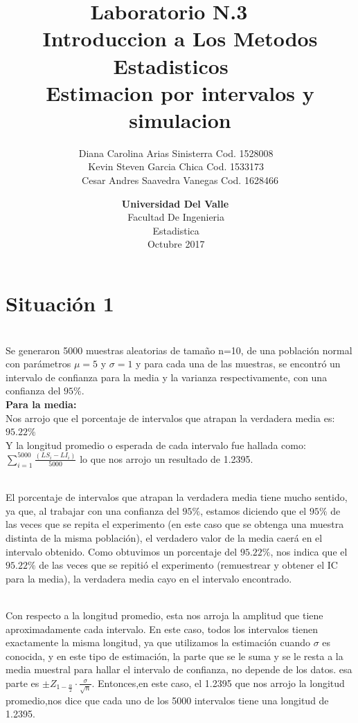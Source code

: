 \documentclass[letterpaper,12pt,onecolumn,titlepage]{article}
\title{
    \textbf{Laboratorio N.3}\
    ~\\{Introduccion a Los Metodos Estadisticos}   
    ~\\{Estimacion por intervalos y simulacion}}
\author{
    {Diana Carolina Arias Sinisterra Cod. 1528008}
 ~\\{Kevin Steven Garcia Chica Cod. 1533173}
 ~\\{Cesar Andres Saavedra Vanegas Cod. 1628466}}
\date{
     \textbf{Universidad Del Valle}\   
    ~\\{Facultad De Ingenieria}
    ~\\{Estadistica}
    ~\\{Octubre 2017}
    ~\\{}}
\begin{document}
 
\renewcommand{\listtablename}{}
\renewcommand{\tablename}{Tabla}
\maketitle
\setcounter{page}{2}
\tableofcontents{}

\thispagestyle{empty}

\newpage
\fancyhead{}
\fancyfoot{}
 
\lfoot{Universidad Del Valle}
\rfoot{\thepage}


 
\pagebreak\section{Situaci\'{o}n 1}
~\\ Se generaron 5000 muestras aleatorias de tama\~{n}o n=10, de una poblaci\'{o}n normal con par\'{a}metros $\mu=5$ y $\sigma=1$ y para cada una de las muestras, se encontr\'{o} un intervalo de confianza para la media y la varianza respectivamente, con una confianza del $95\%$.
~\\ \textbf{Para la media:}
~\\Nos arrojo que el porcentaje de intervalos que atrapan la verdadera media es: $95.22\%$
~\\ Y la longitud promedio o esperada de cada intervalo fue hallada como: $\sum\limits_{i=1}^{5000}\frac{(LS_{i}-LI_{i})}{5000}$ lo que nos arrojo un resultado de 1.2395.

~\\El porcentaje de intervalos que atrapan la verdadera media tiene mucho sentido, ya que, al trabajar con una confianza del $95\%$, estamos diciendo que el $95\%$ de las veces que se repita el experimento (en este caso que se obtenga una muestra distinta de la misma poblaci\'{o}n), el verdadero valor de la media caer\'{a} en el intervalo obtenido. Como obtuvimos un porcentaje del $95.22\%$, nos indica que el $95.22\%$ de las veces que se repiti\'{o} el experimento (remuestrear y obtener el IC para la media), la verdadera media cayo en el intervalo encontrado.

~\\ Con respecto a la longitud promedio, esta nos arroja la amplitud que tiene aproximadamente cada intervalo. En este caso, todos los intervalos tienen exactamente la misma longitud, ya que utilizamos la estimaci\'{o}n cuando $\sigma$ es conocida, y en este tipo de estimaci\'{o}n, la parte que se le suma y se le resta a la media muestral para hallar el intervalo de confianza, no depende de los datos. esa parte es $\pm Z_{1-\frac{\alpha}{2}}\cdot\frac{\sigma}{\sqrt{n}}$. Entonces,en este caso, el 1.2395 que nos arrojo la longitud promedio,nos dice que cada uno de los 5000 intervalos tiene una longitud de 1.2395.
\end{document}
